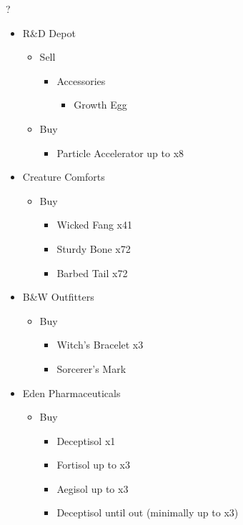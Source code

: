 \begin{shop}{?}
	\begin{itemize}
		\item R\&D Depot
			\begin{itemize}
				\item Sell
					\begin{itemize}
						\item Accessories
							\begin{itemize}
								\item Growth Egg
							\end{itemize}
					\end{itemize}
				\item Buy
					\begin{itemize}
						\item Particle Accelerator up to x8
					\end{itemize}
			\end{itemize}
		\item Creature Comforts
			\begin{itemize}
				\item Buy
					\begin{itemize}
						\item Wicked Fang x41
						\item Sturdy Bone x72
						\item Barbed Tail x72
					\end{itemize}
			\end{itemize}
		\item B\&W Outfitters
			\begin{itemize}
				\item Buy
					\begin{itemize}
						\item Witch's Bracelet x3
						\item Sorcerer's Mark
					\end{itemize}
			\end{itemize}
		\item Eden Pharmaceuticals
			\begin{itemize}
				\item Buy
					\begin{itemize}
						\item Deceptisol x1
						\item Fortisol up to x3
						\item Aegisol up to x3
						\item Deceptisol until out (minimally up to x3)
					\end{itemize}
			\end{itemize}						
	\end{itemize}
\end{shop}

